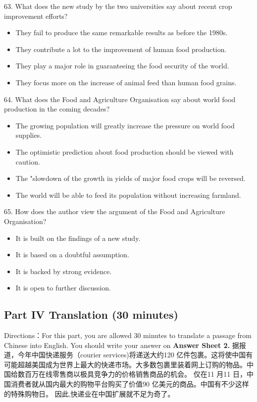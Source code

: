 \documentclass[UTF8,11pt]{ctexart}
\begin{document}
63. What does the new study by the two universities say about recent crop improvement efforts?


\begin{itemize}[leftmargin=2em,itemsep=.2em,topsep=.4em]\item[A.] They fail to produce the same remarkable results as before the 1980s.
\item[B.] They contribute a lot to the improvement of human food production.
\item[C.] They play a major role in guaranteeing the food security of the world.
\item[D.] They focus more on the increase of animal feed than human food grains.
\end{itemize}

64. What does the Food and Agriculture Organisation say about world food production in the coming decades?


\begin{itemize}[leftmargin=2em,itemsep=.2em,topsep=.4em]\item[A.] The growing population will greatly increase the pressure on world food supplies.
\item[B.] The optimistic prediction about food production should be viewed with caution.
\item[C.] The "slowdown of the growth in yields of major food crops will be reversed.
\item[D.] The world will be able to feed its population without increasing farmland.
\end{itemize}

65. How does the author view the argument of the Food and Agriculture Organisation?


\begin{itemize}[leftmargin=2em,itemsep=.2em,topsep=.4em]\item[A.] It is built on the findings of a new study.
\item[B.] It is based on a doubtful assumption.
\item[C.] It is backed by strong evidence.
\item[D.] It is open to further discussion.
\end{itemize}

\subsection*{Part IV Translation (30 minutes)}


Directions：For this part, you are allowed 30 minutes to translate a passage from Chinese into English. You should write your answer on\textbf{ Answer Sheet 2.} 据报道，今年中国快递服务（courier services)将递送大约120 亿件包裹。这将使中国有可能超越美国成为世界上最大的快递市场。大多数包裹里装着网上订购的物品。中国给数百万在线零售商以极具竞争力的价格销售商品的机会。 仅在11 月11 日，中国消费者就从国内最大的购物平台购买了价值90 亿美元的商品。中国有不少这样的特殊购物日。 因此,快递业在中国扩展就不足为奇了。
\end{document}
